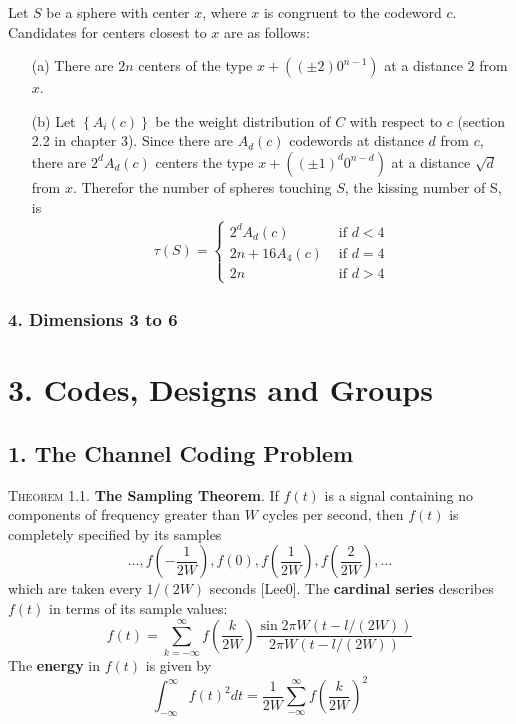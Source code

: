 \documentclass{article}
\renewcommand{\tt}[1]{\text{ #1 }}
\newcommand{\ass}[1]{\left( #1 \right)}
\newcommand{\set}[1]{\left\{ #1 \right\}}
\newcommand{\header}[1]{\vspace{1em}\noindent\textsc{#1.} }
\begin{document}
Let $S$ be a sphere with center $x$, where $x$ is congruent to the codeword $c$.
Candidates for centers closest to $x$ are as follows:
\begin{enumerate}
  \item[(a)]
  There are $2n$ centers of the type $x + ((\pm 2) 0^{n-1})$ at a distance $2$ from $x$.

  \item[(b)]
  Let $\set{A_i(c)}$ be the weight distribution of $C$ with respect to $c$ (section 2.2 in chapter 3).
  Since there are $A_d(c)$ codewords at distance $d$ from $c$, there are $2^d A_d(c)$ centers the type $x + ((\pm 1)^d 0^{n-d})$ at a distance $\sqrt d$ from $x$.
  Therefor the number of spheres touching $S$, the kissing number of S, is
  \begin{align*}
    \tau(S) = \begin{cases}
      2^d A_d(c)     &\tt{if} d < 4 \\
      2n + 16 A_4(c) &\tt{if} d = 4 \\
      2n             &\tt{if} d > 4
    \end{cases}
  \end{align*}
\end{enumerate}

\subsubsection*{4. Dimensions 3 to 6}



\section*{3. Codes, Designs and Groups}

\subsection{1. The Channel Coding Problem}

\header{Theorem 1.1}
\textbf{The Sampling Theorem}.
If $f(t)$ is a signal containing no components of frequency greater than $W$ cycles per second, then $f(t)$ is completely specified by its samples
$$ \dots, f \ass{-\frac{1}{2W}}, f(0), f\ass{\frac{1}{2W}}, f\ass{\frac{2}{2W}}, \dots $$
which are taken every $1/(2W)$ seconds [Lee0].
The \textbf{cardinal series} describes $f(t)$ in terms of its sample values:
$$ f(t) = \sum_{k = -\infty}^\infty f\ass{\frac{k}{2W}} \frac{\sin 2\pi W (t - l/(2W))}{2\pi W (t- l/(2W))} $$
The \textbf{energy} in $f(t)$ is given by
$$ \int_{-\infty}^\infty f(t)^2 dt = \frac{1}{2W} \sum_{-\infty}^\infty f\ass{\frac{k}{2W}}^2 $$
\end{document}
